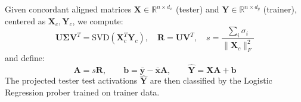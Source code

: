 Given concordant aligned matrices $\mathbf{X} \in \mathbb{R}^{n \times d_x}$ (tester) and $\mathbf{Y} \in \mathbb{R}^{n \times d_y}$ (trainer), centered as $\mathbf{X}_c,\mathbf{Y}_c$, we compute:
\begin{equation}
\label{eq:procrustes_svd}
\mathbf{U}\boldsymbol{\Sigma}\mathbf{V}^{T} = \mathrm{SVD}\!\left(\mathbf{X}_c^{T}\mathbf{Y}_c\right), \quad
\mathbf{R} = \mathbf{U}\mathbf{V}^{T}, \quad
s = \frac{\sum_i \sigma_i}{\|\mathbf{X}_c\|_F^2}
\end{equation}
and define:
\begin{equation}
\label{eq:procrustes_affine}
\mathbf{A} = s\mathbf{R}, \qquad \mathbf{b} = \bar{\mathbf{y}} - \bar{\mathbf{x}}\mathbf{A}, \qquad
\hat{\mathbf{Y}} = \mathbf{X}\mathbf{A} + \mathbf{b}
\end{equation}
The projected tester test activations $\hat{\mathbf{Y}}$ are then classified by the Logistic Regression prober trained on trainer data.

